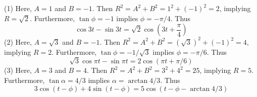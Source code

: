 \documentclass[a4paper]{article}
\begin{document}

(1) Here, \(A = 1\) and \(B = -1\). Then \(R^{2} = A^{2} + B^{2} = 1^{2} + \!\left( -1 \right)^{2} = 2\), implying \(R = \sqrt{2}\). Furthermore, \(\tan \phi = -1\) implies \(\phi = -\pi / 4\). Thus
\[
	\cos 3t - \sin 3t = \sqrt{2} \cos\left( 3t + \frac{\pi }{4} \right)
\]
(2) Here, \(A = \sqrt{3}\) and \(B = -1\). Then \(R^{2} = A^{2} + B^{2} = \!\left( \sqrt{3} \right)^{2} + \!\left( -1 \right)^{2} = 4\), implying \(R = 2\). Furthermore, \(\tan \phi = -1 / \sqrt{3}\) implies \(\phi = - \pi / 6\). Thus
\[
	\sqrt{3} \cos \pi t - \sin \pi t = 2 \cos\left( \pi t + \pi / 6 \right)
\]
(3) Here, \(A = 3\) and \(B = 4\). Then \(R^{2} = A^{2} + B^{2} = 3^{2} + 4^{2} = 25\), implying \(R = 5\). Furthermore, \(\tan \alpha  = 4/3\) implies \(\alpha  = \arctan 4/3\). Thus
\[
	3 \cos\left( t - \phi  \right) + 4 \sin\left( t - \phi  \right) = 5 \cos\left( t - \phi - \arctan 4/3 \right)
\]

\end{document}
